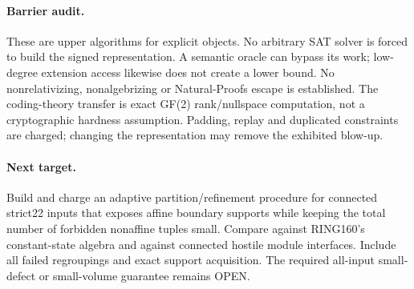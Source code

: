 \documentclass[11pt]{article}
\begin{document}
\paragraph{Barrier audit.}
These are upper algorithms for explicit objects. No arbitrary SAT solver is
forced to build the signed representation. A semantic oracle can bypass its
work; low-degree extension access likewise does not create a lower bound.
No nonrelativizing, nonalgebrizing or Natural-Proofs escape is established.
The coding-theory transfer is exact GF(2) rank/nullspace computation, not a
cryptographic hardness assumption. Padding, replay and duplicated constraints
are charged; changing the representation may remove the exhibited blow-up.

\paragraph{Next target.}
Build and charge an adaptive partition/refinement procedure for connected
strict22 inputs that exposes affine boundary supports while keeping the
total number of forbidden nonaffine tuples small. Compare against RING160's
constant-state algebra and against connected hostile module interfaces.
Include all failed regroupings and exact support acquisition. The required
all-input small-defect or small-volume guarantee remains OPEN.



\end{document}
